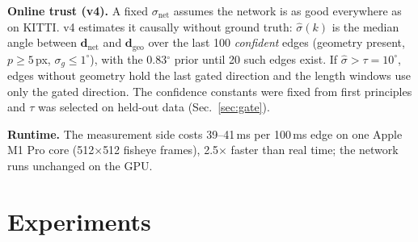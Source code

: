 \documentclass[letterpaper,journal]{IEEEtran}
\newcommand{\dnet}{\mathbf{d}_{\mathrm{net}}}
\newcommand{\dgeo}{\mathbf{d}_{\mathrm{geo}}}
\begin{document}
\textbf{Online trust (v4).} A fixed $\sigma_{\mathrm{net}}$ assumes the network is as good everywhere as on KITTI. v4 estimates it causally without ground truth: $\hat\sigma(k)$ is the median angle between $\dnet$ and $\dgeo$ over the last 100 \emph{confident} edges (geometry present, $p\ge5$\,px, $\sigma_g\le1^\circ$), with the 0.83$^\circ$ prior until 20 such edges exist. If $\hat\sigma>\tau=10^\circ$, edges without geometry hold the last gated direction and the length windows use only the gated direction. The confidence constants were fixed from first principles and $\tau$ was selected on held-out data (Sec.~\ref{sec:gate}).

\textbf{Runtime.} The measurement side costs 39--41\,ms per 100\,ms edge on one Apple M1 Pro core (512$\times$512 fisheye frames), 2.5$\times$ faster than real time; the network runs unchanged on the GPU.

\section{Experiments}
\end{document}
